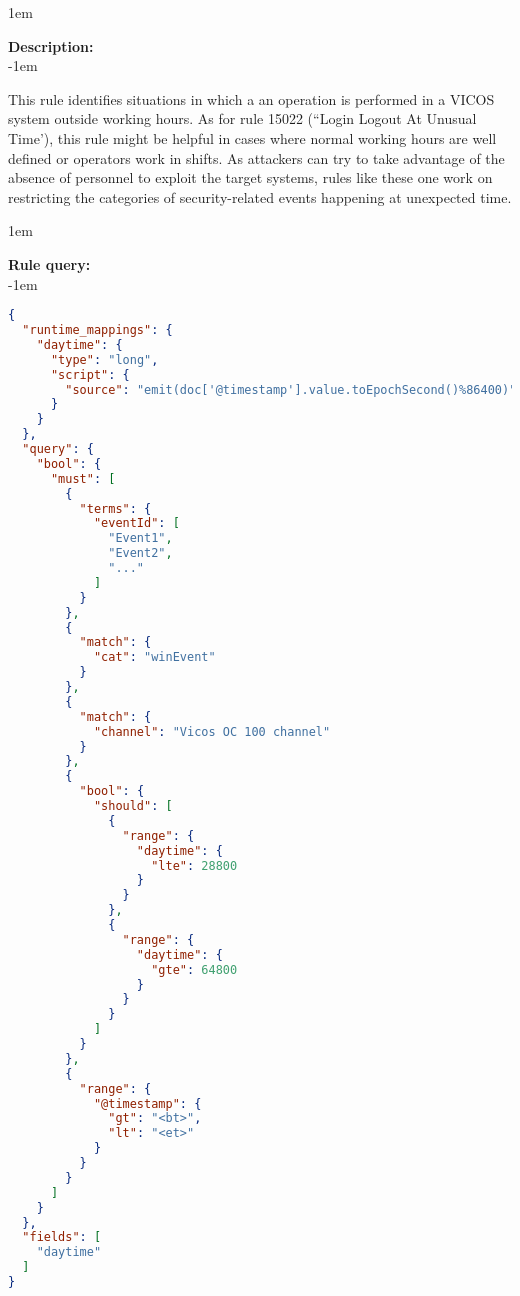 \openup 1em

{\bf Description:} \\

\openup -1em
\vspace{-2em}


This rule identifies situations in which a an operation is performed in a VICOS system outside working hours. As for rule 15022 (``Login Logout At Unusual Time'), this rule might be helpful in cases where normal working hours are well defined or operators work in shifts. As attackers can try to take advantage of the absence of personnel to exploit the target systems, rules like these one work on restricting the categories of security-related events happening at unexpected time.

\openup 1em

{\bf Rule query:} \\

\openup -1em
\vspace{-2em}

\begin{lstlisting}[language=json,firstnumber=1]
{
  "runtime_mappings": {
    "daytime": {
      "type": "long",
      "script": {
        "source": "emit(doc['@timestamp'].value.toEpochSecond()%86400)"
      }
    }
  },
  "query": {
    "bool": {
      "must": [
        {
          "terms": {
            "eventId": [
              "Event1",
              "Event2",
              "..."
            ]
          }
        },
        {
          "match": {
            "cat": "winEvent"
          }
        },
        {
          "match": {
            "channel": "Vicos OC 100 channel"
          }
        },
        {
          "bool": {
            "should": [
              {
                "range": {
                  "daytime": {
                    "lte": 28800
                  }
                }
              },
              {
                "range": {
                  "daytime": {
                    "gte": 64800
                  }
                }
              }
            ]
          }
        },
        {
          "range": {
            "@timestamp": {
              "gt": "<bt>",
              "lt": "<et>"
            }
          }
        }
      ]
    }
  },
  "fields": [
    "daytime"
  ]
}
\end{lstlisting}

